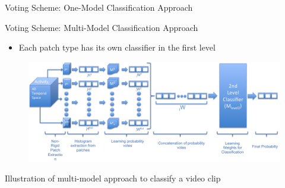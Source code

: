 \documentclass[final,hyperref={pdfpagelabels=false}]{beamer}
\begin{document}
\begin{frame}[t]
\begin{columns}[t]
\begin{column}{.465\textwidth}
\begin{block}{Voting Scheme: One-Model Classification Approach}

\end{block}


\begin{block}{Voting Scheme: Multi-Model Classification Approach}

\begin{itemize}
\item Each patch type has its own classifier in the first level
\end{itemize}

\begin{figure}
\includegraphics[width=1.0\linewidth]{figures/multiModelApproach3}%
\end{figure}

\begin{center}
{\small Illustration of multi-model approach to classify a video clip}
\end{center}



\end{block}
\end{column}
\end{columns}
\end{frame}
\end{document}
